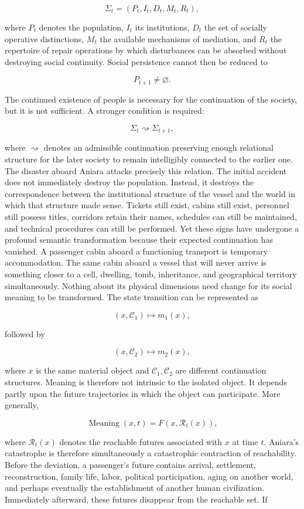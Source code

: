 \documentclass[11pt,oneside]{book}
\theoremstyle{definition}
\theoremstyle{remark}
\begin{document}
\[
\Sigma_t=(P_t,I_t,D_t,M_t,R_t),
\]

where \(P_t\) denotes the population, \(I_t\) its institutions, \(D_t\) the set of socially
operative distinctions, \(M_t\) the available mechanisms of mediation, and \(R_t\) the repertoire of
repair operations by which disturbances can be absorbed without destroying social continuity. Social
persistence cannot then be reduced to

\[
P_{t+1}\neq\varnothing.
\]

The continued existence of people is necessary for the continuation of the society, but it is not
sufficient. A stronger condition is required:

\[
\Sigma_t\rightsquigarrow\Sigma_{t+1},
\]

where \(\rightsquigarrow\) denotes an admissible continuation preserving enough relational structure
for the later society to remain intelligibly connected to the earlier one. The disaster aboard
Aniara attacks precisely this relation. The initial accident does not immediately destroy the
population. Instead, it destroys the correspondence between the institutional structure of the
vessel and the world in which that structure made sense. Tickets still exist, cabins still exist,
personnel still possess titles, corridors retain their names, schedules can still be maintained, and
technical procedures can still be performed. Yet these signs have undergone a profound semantic
transformation because their expected continuation has vanished. A passenger cabin aboard a
functioning transport is temporary accommodation. The same cabin aboard a vessel that will never
arrive is something closer to a cell, dwelling, tomb, inheritance, and geographical territory
simultaneously. Nothing about its physical dimensions need change for its social meaning to be
transformed. The state transition can be represented as

\[
(x,\mathcal{C}_1)\mapsto m_1(x),
\]

followed by

\[
(x,\mathcal{C}_2)\mapsto m_2(x),
\]

where \(x\) is the same material object and \(\mathcal{C}_1,\mathcal{C}_2\) are different
continuation structures. Meaning is therefore not intrinsic to the isolated object. It depends
partly upon the future trajectories in which the object can participate. More generally,

\[
\operatorname{Meaning}(x,t) = F\!\left(x,\mathcal{R}_t(x)\right),
\]

where \(\mathcal{R}_t(x)\) denotes the reachable futures associated with \(x\) at time \(t\).
Aniara's catastrophe is therefore simultaneously a catastrophic contraction of reachability. Before
the deviation, a passenger's future contains arrival, settlement, reconstruction, family life,
labor, political participation, aging on another world, and perhaps eventually the establishment of
another human civilization. Immediately afterward, these futures disappear from the reachable set.
If
\end{document}
